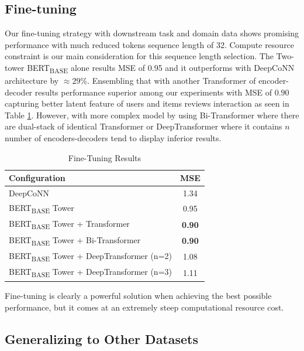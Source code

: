 \documentclass[11pt,a4paper]{article}
\begin{document}
\subsection{Fine-tuning}

Our fine-tuning strategy with downstream task and domain data shows promising performance with much reduced tokens sequence length of 32. Compute resource constraint is our main consideration for this sequence length selection. The Two-tower BERT\textsubscript{BASE} alone results MSE of 0.95 and it outperforms \citet{zheng2017joint-modeling} with DeepCoNN architecture by $\approx29$\%. Ensembling that with another Transformer of encoder-decoder \citep{vaswani2017attention} results performance superior among our experiments with MSE of $0.90$ capturing better latent feature of users and items reviews interaction as seen in Table \ref{table:3}. However, with more complex model by using Bi-Transformer where there are dual-stack of identical Transformer or DeepTransformer where it contains $n$ number of encoders-decoders tend to display inferior results.

\begin{table}[H]
\centering
\small
\begin{tabular}{@{} l c @{}}
\toprule
\multicolumn{1}{l}{\textbf{Configuration}}    & \textbf{MSE}  \\ 
\midrule
 DeepCoNN & 1.34 \\ 
 BERT\textsubscript{BASE} Tower & 0.95 \\
 BERT\textsubscript{BASE} Tower + Transformer & \textbf{0.90} \\
 BERT\textsubscript{BASE} Tower + Bi-Transformer & \textbf{0.90} \\
 BERT\textsubscript{BASE} Tower + DeepTransformer (n=2) & 1.08 \\
 BERT\textsubscript{BASE} Tower + DeepTransformer (n=3) & 1.11 \\
\bottomrule
\end{tabular}
\caption{Fine-Tuning Results}
\label{table:3}
\end{table}

Fine-tuning is clearly a powerful solution when achieving the best possible performance, but it comes at an extremely steep computational resource cost.

\subsection{Generalizing to Other Datasets}
\end{document}
